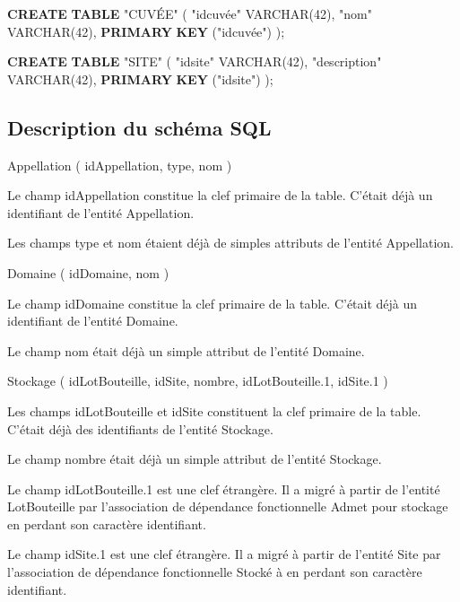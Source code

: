 \documentclass[11pt]{article}
\newenvironment{Shaded}{}{}
\newcommand{\KeywordTok}[1]{\textcolor[rgb]{0.00,0.44,0.13}{\textbf{{#1}}}}
\newcommand{\DataTypeTok}[1]{\textcolor[rgb]{0.56,0.13,0.00}{{#1}}}
\newcommand{\DecValTok}[1]{\textcolor[rgb]{0.25,0.63,0.44}{{#1}}}
\newcommand{\OtherTok}[1]{\textcolor[rgb]{0.00,0.44,0.13}{{#1}}}
\newcommand{\NormalTok}[1]{{#1}}
\begin{document}
\begin{Shaded}
\begin{Highlighting}[]
\KeywordTok{CREATE} \KeywordTok{TABLE} \OtherTok{"CUVÉE"}\NormalTok{ (}
  \OtherTok{"idcuvée"} \DataTypeTok{VARCHAR}\NormalTok{(}\DecValTok{42}\NormalTok{),}
  \OtherTok{"nom"} \DataTypeTok{VARCHAR}\NormalTok{(}\DecValTok{42}\NormalTok{),}
  \KeywordTok{PRIMARY} \KeywordTok{KEY}\NormalTok{ (}\OtherTok{"idcuvée"}\NormalTok{)}
\NormalTok{);}

\KeywordTok{CREATE} \KeywordTok{TABLE} \OtherTok{"SITE"}\NormalTok{ (}
  \OtherTok{"idsite"} \DataTypeTok{VARCHAR}\NormalTok{(}\DecValTok{42}\NormalTok{),}
  \OtherTok{"description"} \DataTypeTok{VARCHAR}\NormalTok{(}\DecValTok{42}\NormalTok{),}
  \KeywordTok{PRIMARY} \KeywordTok{KEY}\NormalTok{ (}\OtherTok{"idsite"}\NormalTok{)}
\NormalTok{);}
\end{Highlighting}
\end{Shaded}

    \hypertarget{description-du-schuxe9ma-sql}{%
\subsection{Description du schéma
SQL}\label{description-du-schuxe9ma-sql}}

{Appellation} ( {idAppellation}, {type}, {nom} )

Le champ idAppellation constitue la clef primaire de la table. C'était
déjà un identifiant de l'entité Appellation.

Les champs type et nom étaient déjà de simples attributs de l'entité
Appellation.

{Domaine} ( {idDomaine}, {nom} )

Le champ idDomaine constitue la clef primaire de la table. C'était déjà
un identifiant de l'entité Domaine.

Le champ nom était déjà un simple attribut de l'entité Domaine.

{Stockage} ( {idLotBouteille}, {idSite}, {nombre}, {idLotBouteille.1},
{idSite.1} )

Les champs idLotBouteille et idSite constituent la clef primaire de la
table. C'était déjà des identifiants de l'entité Stockage.

Le champ nombre était déjà un simple attribut de l'entité Stockage.

Le champ idLotBouteille.1 est une clef étrangère. Il a migré à partir de
l'entité LotBouteille par l'association de dépendance fonctionnelle
Admet pour stockage en perdant son caractère identifiant.

Le champ idSite.1 est une clef étrangère. Il a migré à partir de
l'entité Site par l'association de dépendance fonctionnelle Stocké à en
perdant son caractère identifiant.
\end{document}
